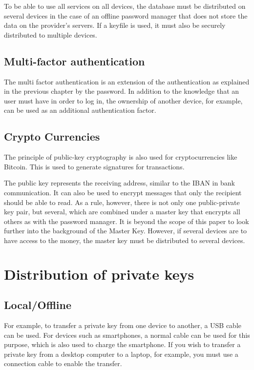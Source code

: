 \documentclass[12pt,oneside,a4paper,parskip]{scrbook}
\begin{document}
To be able to use all services on all devices, the database must be distributed on several devices in the case of an offline password manager that does not store the data on the provider's servers. If a keyfile is used, it must also be securely distributed to multiple devices.

\subsection{Multi-factor authentication}
The multi factor authentication is an extension of the authentication as explained in the previous chapter by the password. In addition to the knowledge that an user must have in order to log in, the ownership of another device, for example, can be used as an additional authentication factor. 

\subsection{Crypto Currencies}
The principle of public-key cryptography is also used for cryptocurrencies like Bitcoin. This is used to generate signatures for transactions. 

The public key represents the receiving address, similar to the IBAN in bank communication. It can also be used to encrypt messages that only the recipient should be able to read. As a rule, however, there is not only one public-private key pair, but several, which are combined under a master key that encrypts all others as with the password manager. It is beyond the scope of this paper to look further into the background of the Master Key. However, if several devices are to have access to the money, the master key must be distributed to several devices.


\section{Distribution of private keys}
\label{sec:distribution}

\subsection{Local/Offline}
For example, to transfer a private key from one device to another, a USB cable can be used. For devices such as smartphones, a normal cable can be used for this purpose, which is also used to charge the smartphone. If you wish to transfer a private key from a desktop computer to a laptop, for example, you must use a connection cable to enable the transfer.
\end{document}
